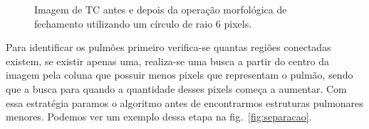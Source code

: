 \begin{figure}[!ht]
 \begin{center}
 \end{center}
 \caption{Imagem de TC antes e depois da operação morfológica de fechamento utilizando um círculo de raio 6 pixels.}
 \label{fig:fechamentoAplicado}
\end{figure}

Para identificar os pulmões primeiro verifica-se quantas regiões conectadas existem, se existir apenas uma, realiza-se uma busca a partir do centro da imagem pela coluna que possuir menos pixels que representam o pulmão, sendo que a busca para quando a quantidade desses pixels começa a aumentar. Com essa estratégia paramos o algoritmo antes de encontrarmos estruturas pulmonares menores. Podemos ver um exemplo dessa etapa na fig.~\ref{fig:separacao}.

